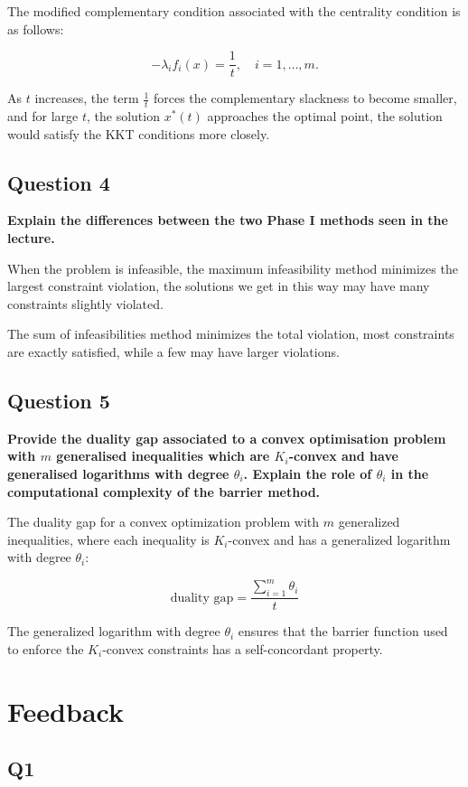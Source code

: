 The modified complementary condition associated with the centrality condition is as follows:

$$
-\lambda_i f_i(x) = \frac{1}{t}, \quad i = 1, \dots, m.
$$

As \( t \) increases, the term \( \frac{1}{t} \) forces the complementary slackness to become smaller, and for large \( t \), the solution \( x^*(t) \) approaches the optimal point, the solution would satisfy the KKT conditions more closely. 


\subsection*{Question 4}
\textbf{Explain the differences between the two Phase I methods seen in the lecture.}

When the problem is infeasible, the maximum infeasibility method minimizes the largest constraint violation, the solutions we get in this way may have many constraints slightly violated.

The sum of infeasibilities method minimizes the total violation, most constraints are exactly satisfied, while a few may have larger violations.  

\subsection*{Question 5}
\textbf{Provide the duality gap associated to a convex optimisation problem with $m$ generalised inequalities which are $K_i$-convex and have generalised logarithms with degree $\theta_i$. Explain the role of $\theta_i$ in the computational complexity of the barrier method.}


The duality gap for a convex optimization problem with $m$ generalized inequalities, where each inequality is $K_i$-convex and has a generalized logarithm with degree $\theta_i$:

$$
\text{duality gap} = \frac {\sum_{i=1}^m \theta_i}{t}
$$

The generalized logarithm with degree $\theta_i$ ensures that the barrier function used to enforce the $K_i$-convex constraints has a self-concordant property. 



\section*{Feedback}

\subsection*{Q1}

